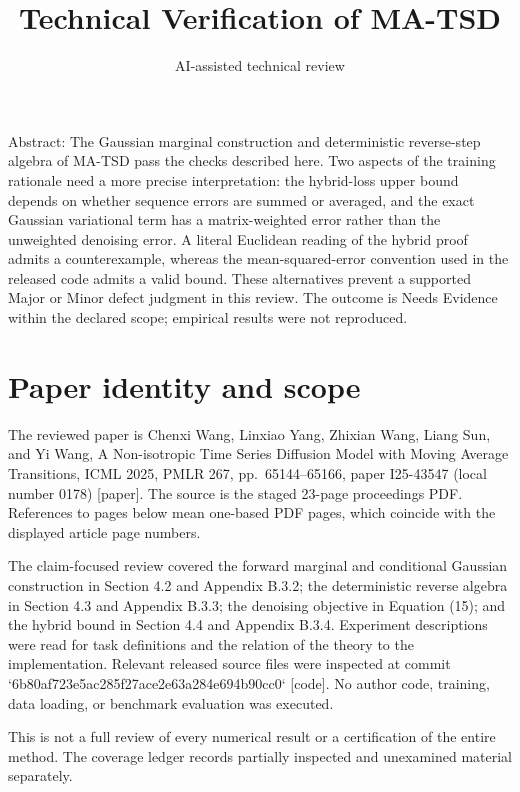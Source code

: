 \documentclass[10pt]{article}
\title{Technical Verification of MA-TSD}
\author{AI-assisted technical review}
\date{}
\begin{document}
\maketitle
Abstract: The Gaussian marginal construction and deterministic reverse-step algebra of MA-TSD pass the checks described here. Two aspects of the training rationale need a more precise interpretation: the hybrid-loss upper bound depends on whether sequence errors are summed or averaged, and the exact Gaussian variational term has a matrix-weighted error rather than the unweighted denoising error. A literal Euclidean reading of the hybrid proof admits a counterexample, whereas the mean-squared-error convention used in the released code admits a valid bound. These alternatives prevent a supported Major or Minor defect judgment in this review. The outcome is Needs Evidence within the declared scope; empirical results were not reproduced.\par
\section*{Paper identity and scope}
The reviewed paper is Chenxi Wang, Linxiao Yang, Zhixian Wang, Liang Sun, and Yi Wang, A Non-isotropic Time Series Diffusion Model with Moving Average Transitions, ICML 2025, PMLR 267, pp. 65144–65166, paper I25-43547 (local number 0178) [paper]. The source is the staged 23-page proceedings PDF. References to pages below mean one-based PDF pages, which coincide with the displayed article page numbers.\par
The claim-focused review covered the forward marginal and conditional Gaussian construction in Section 4.2 and Appendix B.3.2; the deterministic reverse algebra in Section 4.3 and Appendix B.3.3; the denoising objective in Equation (15); and the hybrid bound in Section 4.4 and Appendix B.3.4. Experiment descriptions were read for task definitions and the relation of the theory to the implementation. Relevant released source files were inspected at commit `6b80af723e5ac285f27ace2e63a284e694b90cc0` [code]. No author code, training, data loading, or benchmark evaluation was executed.\par
This is not a full review of every numerical result or a certification of the entire method. The coverage ledger records partially inspected and unexamined material separately.\par
\end{document}
